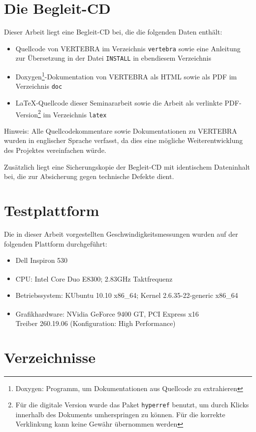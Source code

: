 \documentclass[ngerman,pdftex,paper=A4,DIV=calc,titlepage,12pt]{scrartcl}
\newtheorem[L]{boxedDefinition}{Definition}
\begin{document}
\section{Die Begleit-CD}
Dieser Arbeit liegt eine Begleit-CD bei, die die folgenden Daten enthält:
\begin{itemize}
 \item Quellcode von VERTEBRA im Verzeichnis \texttt{vertebra} sowie eine Anleitung zur Übersetzung in der Datei \texttt{INSTALL} in ebendiesem Verzeichnis
 \item Doxygen\footnote{Doxygen: Programm, um Dokumentationen aus Quellcode zu extrahieren}-Dokumentation von VERTEBRA als HTML sowie als PDF im Verzeichnis \texttt{doc}
 \item \LaTeX-Quellcode dieser Seminararbeit sowie die Arbeit als verlinkte PDF-Version\footnote{Für die digitale Version wurde das Paket \texttt{hyperref} benutzt, um durch Klicks innerhalb des Dokuments umherspringen zu können. Für die korrekte Verklinkung kann keine Gewähr übernommen werden} im Verzeichnis \texttt{latex} 
\end{itemize}

Hinweis: Alle Quellcodekommentare sowie Dokumentationen zu VERTEBRA wurden in englischer Sprache verfasst, da dies eine mögliche Weiterentwicklung des Projektes vereinfachen würde.

Zusätzlich liegt eine Sicherungskopie der Begleit-CD mit identischem Dateninhalt bei, die zur Absicherung gegen technische Defekte dient.

\section{Testplattform}\label{apdx:testplatform}
Die in dieser Arbeit vorgestellten Geschwindigkeitsmessungen wurden auf der folgenden Plattform durchgeführt:
\begin{itemize}
  \item Dell Inspiron 530
  \item CPU: Intel\textsuperscript{\textregistered} Core Duo E8300; 2.83GHz Taktfrequenz
  \item Betriebssystem: KUbuntu 10.10 x86\_64; Kernel 2.6.35-22-generic x86\_64
  \item Grafikhardware: NVidia\textsuperscript{\textregistered} GeForce 9400 GT, PCI Express x16\\
	Treiber 260.19.06 (Konfiguration: High Performance)
\end{itemize}
\newpage
\section{Verzeichnisse}
\listoffigures
\renewcommand\refname{Literatur- und Quellenverzeichnis}


\clearpage
\end{document}
